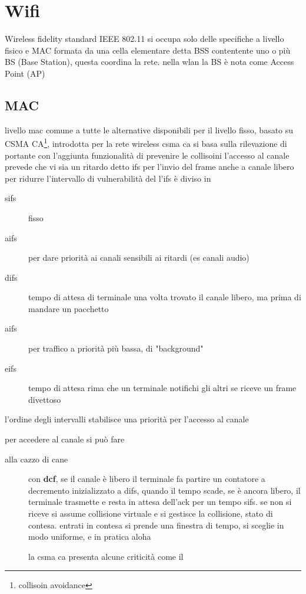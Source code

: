 \documentclass[11pt]{article}
\begin{document}
\section{Wifi}
\label{sec:orgfd4c951}
Wireless fidelity
standard IEEE 802.11
si occupa solo delle specifiche a livello fisico e MAC
formata da una cella elementare detta BSS contentente uno o più BS (Base Station), questa coordina la rete.
nella wlan la BS è nota come Access Point (AP)

\subsection{MAC}
\label{sec:org51b0637}
livello mac comune a tutte le alternative disponibili per il livello fisso,
basato su CSMA CA\footnote{collisoin avoidance}, introdotta per la rete wireless
csma ca si basa sulla rilevazione di portante con l'aggiunta funzionalità di prevenire le collisoini
l'accesso al canale prevede che vi sia un ritardo detto ifs per l'invio del frame anche a canale libero
per ridurre l'intervallo di vulnerabilità del l'ifs è diviso in
\begin{description}
\item[{sifs}] fisso
\item[{aifs}] per dare priorità ai canali sensibili ai ritardi (es canali audio)
\item[{difs}] tempo di attesa di terminale una volta trovato il canale libero, ma prima di mandare un pacchetto
\item[{aifs}] per traffico a priorità più bassa, di "background"
\item[{eifs}] tempo di attesa rima che un terminale notifichi gli altri se riceve un frame divettoso
\end{description}
l'ordine degli intervalli stabilisce una priorità per l'accesso al canale

per accedere al canale si può fare
\begin{description}
\item[{alla cazzo di cane}] con \textbf{dcf}, se il canale è libero il terminale fa partire un contatore a decremento inizializzato a difs, quando il tempo scade, se è ancora libero, il terminale trasmette e resta in attesa dell'ack per un tempo sifs.
se non si riceve si assume collisione virtuale e si gestisce la collisione, stato di contesa.
entrati in contesa si prende una finestra di tempo, si sceglie in modo uniforme, e in pratica aloha

la csma ca presenta alcune criticità come il
\end{description}
\end{document}
